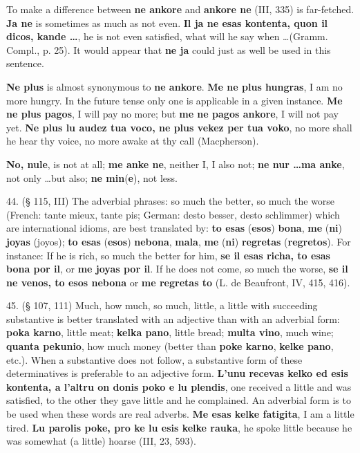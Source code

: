 To make a difference between \textbf{ne ankore} and \textbf{ankore ne} (III, 335) is far-fetched. \textbf{Ja ne} is sometimes as much as not even. \textbf{Il ja ne esas kontenta, quon il dicos, kande \ldots}, he is not even satisfied, what will he say when \ldots (Gramm. Compl., p. 25). It would appear that \textbf{ne ja} could just as well be used in this sentence.

\textbf{Ne plus} is almost synonymous to \textbf{ne ankore}. \textbf{Me ne plus hungras}, I am no more hungry. In the future tense only one is applicable in a given instance. \textbf{Me ne plus pagos}, I will pay no more; but \textbf{me ne pagos ankore}, I will not pay yet. \textbf{Ne plus lu audez tua voco, ne plus vekez per tua voko}, no more shall he hear thy voice, no more awake at thy call (Macpherson).

\textbf{No, nule}, is not at all; \textbf{me anke ne}, neither I, I also not; \textbf{ne nur \ldots ma anke}, not only \ldots but also; \textbf{ne min}(\textbf{e}), not less.

44. (§ 115, III) The adverbial phrases: so much the better, so much the worse (French: tante mieux, tante pis; German: desto besser, desto schlimmer) which are international idioms, are best translated by: \textbf{to esas }(\textbf{esos})\textbf{ bona}, \textbf{me }(\textbf{ni})\textbf{ joyas }(joyos\textbf{}); \textbf{to esas }(\textbf{esos})\textbf{ nebona}, \textbf{mala}, \textbf{me }(\textbf{ni})\textbf{ regretas }(\textbf{regretos}). For instance: If he is rich, so much the better for him, \textbf{se il esas richa, to esas bona por il}, or \textbf{me joyas por il}. If he does not come, so much the worse, \textbf{se il ne venos, to esos nebona} or \textbf{me regretas to} (L. de Beaufront, IV, 415, 416). %

45. (§ 107, 111) Much, how much, so much, little, a little with succeeding substantive is better translated with an adjective than with an adverbial form: \textbf{poka karno}, little meat; \textbf{kelka pano}, little bread; \textbf{multa vino}, much wine; \textbf{quanta pekunio}, how much money (better than \textbf{poke karno}, \textbf{kelke pano}, etc.). When a substantive does not follow, a substantive form of these determinatives is preferable to an adjective form. \textbf{L'unu recevas kelko ed esis kontenta, a l'altru on donis poko e lu plendis}, one received a little and was satisfied, to the other they gave little and he complained. An adverbial form is to be used when these words are real adverbs. \textbf{Me esas kelke fatigita}, I am a little tired. \textbf{Lu parolis poke, pro ke lu esis kelke rauka}, he spoke little because he was somewhat (a little) hoarse (III, 23, 593). %

